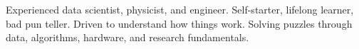 

\begin{cvparagraph}

Experienced data scientist, physicist, and engineer. Self-starter, lifelong learner, bad pun teller. Driven to understand how things work. Solving puzzles through data, algorithms, hardware, and research fundamentals. 
\end{cvparagraph}